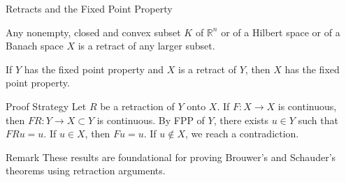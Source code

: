 \documentclass[aspectratio=169,10pt]{beamer}
\begin{document}
\begin{frame}[allowframebreaks]{Retracts and the Fixed Point Property}
    \begin{theorem}[Theorem 5.46]
        Any nonempty, closed and convex subset $K$ of $\mathbb{R}^n$ or of a Hilbert space or of a Banach space $X$ is a retract of any larger subset.
    \end{theorem}

    \begin{theorem}[Theorem 5.47]
        If $Y$ has the fixed point property and $X$ is a retract of $Y$, then $X$ has the fixed point property.
    \end{theorem}

    \begin{block}{Proof Strategy}
        Let $R$ be a retraction of $Y$ onto $X$. If $F: X \to X$ is continuous, then $FR: Y \to X \subset Y$ is continuous. By FPP of $Y$, there exists $u \in Y$ such that $FRu = u$. If $u \in X$, then $Fu = u$. If $u \notin X$, we reach a contradiction.
    \end{block}

    \begin{block}{Remark}
        These results are foundational for proving Brouwer's and Schauder's theorems using retraction arguments.
    \end{block}
\end{frame}
\end{document}
